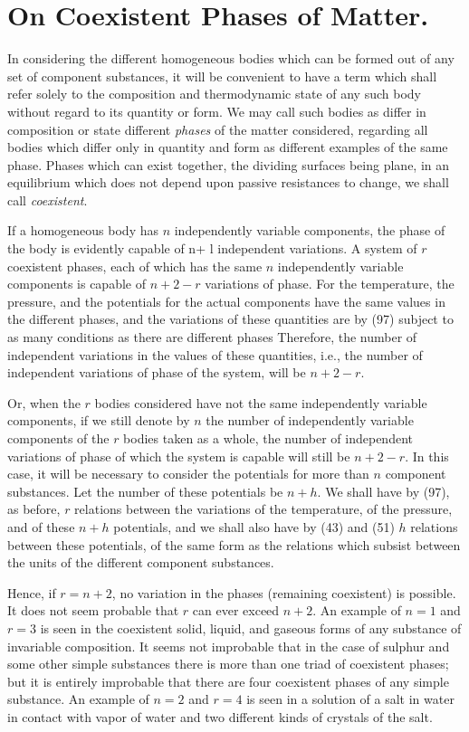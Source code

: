 \documentclass[12pt]{memoir}
\begin{document}
\section{On Coexistent Phases of Matter.}
In considering the different homogeneous bodies which can be formed out of any set of component substances, it will be convenient to have a term which shall refer solely to the composition and thermodynamic state of any such body without regard to its quantity or form. We may call such bodies as differ in composition or state different \textit{phases} of the matter considered, regarding all bodies which differ only in quantity and form as different examples of the same phase. Phases which can exist together, the dividing surfaces being plane, in an equilibrium which does not depend upon passive resistances to change, we shall call \textit{coexistent}.


If a homogeneous body has $n$ independently variable components, the phase of the body is evidently capable of n+ l independent variations. A system of $r$ coexistent phases, each of which has the same $n$ independently variable components is capable of $n+2-r$ variations of phase. For the temperature, the pressure, and the potentials for the actual components have the same values in the different phases, and the variations of these quantities are by (97) subject to as many conditions as there are different phases Therefore, the number of independent variations in the values of these quantities, i.e., the number of independent variations of phase of the system, will be $n+2-r$.


Or, when the $r$ bodies considered have not the same independently variable components, if we still denote by $n$ the number of independently variable components of the $r$ bodies taken as a whole, the number of independent variations of phase of which the system is capable will still be $n+2-r$. In this case, it will be necessary to consider the potentials for more than $n$ component substances. Let the number of these potentials be $n+h$. We shall have by (97), as before, $r$ relations between the variations of the temperature, of the pressure, and of these $n+h$ potentials, and we shall also have by (43) and (51) $h$ relations between these potentials, of the same form as the relations which subsist between the units of the different component substances.


Hence, if $r=n+2$, no variation in the phases (remaining coexistent) is possible. It does not seem probable that $r$ can ever exceed $n+ 2$. An example of $n=1$ and $r=3$ is seen in the coexistent solid, liquid, and gaseous forms of any substance of invariable composition. It seems not improbable that in the case of sulphur and some other simple substances there is more than one triad of coexistent phases; but it is entirely improbable that there are four coexistent phases of any simple substance. An example of $n=2$ and $r = 4$ is seen in a solution of a salt in water in contact with vapor of water and two different kinds of crystals of the salt.
\end{document}
